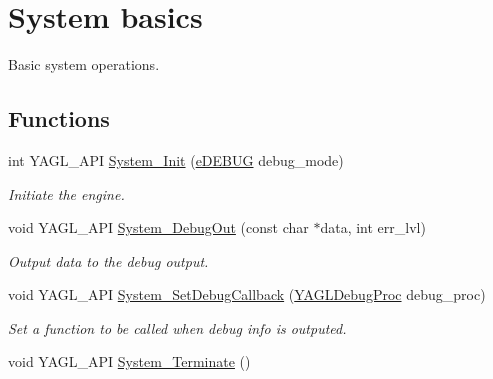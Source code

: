 \hypertarget{group____system}{\section{System basics}
\label{group____system}
}


Basic system operations.  


\subsection*{Functions}
\begin{DoxyCompactItemize}
\item 
int Y\-A\-G\-L\-\_\-\-A\-P\-I \hyperlink{group____system_gaeec34f715f6038b0f675ff7c3105a152}{System\-\_\-\-Init} (\hyperlink{group____enums_gaa768cfbfa3bdcb70751d9e3c37b00350}{e\-D\-E\-B\-U\-G} debug\-\_\-mode)
\begin{DoxyCompactList}\small\item\em Initiate the engine. \end{DoxyCompactList}\item 
void Y\-A\-G\-L\-\_\-\-A\-P\-I \hyperlink{group____system_ga7f28a68bb6c2af19c7004acc26e0cbdb}{System\-\_\-\-Debug\-Out} (const char $\ast$data, int err\-\_\-lvl)
\begin{DoxyCompactList}\small\item\em Output data to the debug output. \end{DoxyCompactList}\item 
void Y\-A\-G\-L\-\_\-\-A\-P\-I \hyperlink{group____system_gacf99e83f1f621c84c147e7f99f707cf4}{System\-\_\-\-Set\-Debug\-Callback} (\hyperlink{group____callbacks_ga7ae123bcbd5a4a7fb48b73bb9ebd04bc}{Y\-A\-G\-L\-Debug\-Proc} debug\-\_\-proc)
\begin{DoxyCompactList}\small\item\em Set a function to be called when debug info is outputed. \end{DoxyCompactList}\item 
\hypertarget{group____system_ga5916f5935a0317035c50844537727312}{void Y\-A\-G\-L\-\_\-\-A\-P\-I \hyperlink{group____system_ga5916f5935a0317035c50844537727312}{System\-\_\-\-Terminate} ()}\label{group____system_ga5916f5935a0317035c50844537727312}


\end{DoxyCompactItemize}
